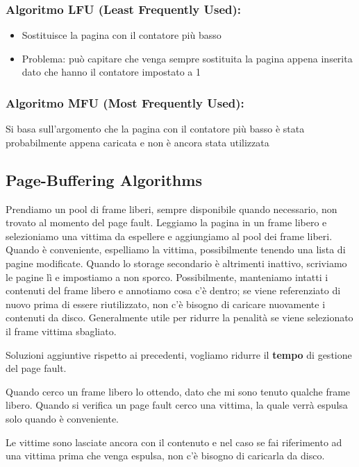 \subsubsection{Algoritmo LFU (Least Frequently Used):}

\begin{itemize}
  \item Sostituisce la pagina con il contatore più basso
  \item Problema: può capitare che venga sempre sostituita la pagina appena inserita dato che hanno il contatore impostato a 1
\end{itemize}


\subsubsection{Algoritmo MFU (Most Frequently Used):}

Si basa sull'argomento che la pagina con il contatore più basso è stata probabilmente appena caricata e non è ancora stata utilizzata


\subsection{Page-Buffering Algorithms}

Prendiamo un pool di frame liberi, sempre disponibile quando necessario, non trovato al momento del page fault. Leggiamo la pagina in un frame libero e selezioniamo una vittima da espellere e aggiungiamo al pool dei frame liberi. Quando è conveniente, espelliamo la vittima, possibilmente tenendo una lista di pagine modificate. Quando lo storage secondario è altrimenti inattivo, scriviamo le pagine lì e impostiamo a non sporco. Possibilmente, manteniamo intatti i contenuti del frame libero e annotiamo cosa c'è dentro; se viene referenziato di nuovo prima di essere riutilizzato, non c'è bisogno di caricare nuovamente i contenuti da disco. Generalmente utile per ridurre la penalità se viene selezionato il frame vittima sbagliato.


Soluzioni aggiuntive rispetto ai precedenti, vogliamo ridurre il \textbf{tempo} di gestione del page fault.

Quando cerco un frame libero lo ottendo, dato che mi sono tenuto qualche frame libero.
Quando si verifica un page fault cerco una vittima, la quale verrà espulsa solo quando è conveniente.

Le vittime sono lasciate ancora con il contenuto e nel caso se fai riferimento ad una
vittima prima che venga espulsa, non c'è bisogno di caricarla da disco.


